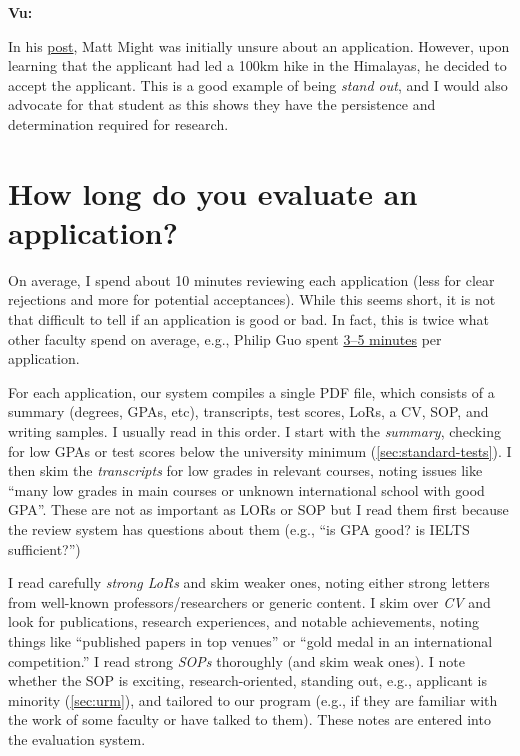 \documentclass[oneside,11pt,dvipsnames]{book}
\newenvironment{commentbox}[1][]{
  \small
  \begin{mybox}
    {\small \textbf{#1}}
  }{
  \end{mybox}
}
\begin{document}
\begin{commentbox}[Vu:]
In his \href{https://matt.might.net/articles/how-to-apply-and-get-in-to-graduate-school-in-science-mathematics-engineering-or-computer-science/}{post}, Matt Might was initially unsure about an application. However, upon learning that the applicant had led a 100km hike in the Himalayas, he decided to accept the applicant.  This is a good example of being \emph{stand out}, and I would also advocate for that student as this shows they have the persistence and determination required for research.
\end{commentbox}


\section{How long do you evaluate an application?}\label{sec:ievaluate}

On average, I spend about 10 minutes reviewing each application (less for clear rejections and more for potential acceptances). While this seems short, it is not that difficult to tell if an application is good or bad.  In fact, this
is twice what other faculty spend on average, e.g., Philip Guo spent \href{https://pg.ucsd.edu/PhD-application-tips.htm}{3--5 minutes} per application.

For each application, our system compiles a single PDF file, which consists of a summary (degrees, GPAs, etc), transcripts, test scores, LoRs, a CV, SOP, and writing samples. I usually read in this order. I start with the \emph{summary}, checking for low GPAs or test scores below the university minimum (\autoref{sec:standard-tests}). I then skim the \emph{transcripts} for low grades in relevant courses, noting issues like ``many low grades in main courses or unknown international school with good GPA''.  These are not as important as LORs or SOP but I read them first because the review system has questions about them (e.g., ``is GPA good? is IELTS sufficient?'')

I read carefully \emph{strong LoRs} and skim weaker ones, noting either strong letters from well-known professors/researchers or generic content. I skim over \emph{CV} and look for publications, research experiences, and notable achievements, noting things like ``published papers in top venues'' or ``gold medal in an international competition.''
I read strong \emph{SOPs} thoroughly (and skim weak ones). I note whether the SOP is exciting, research-oriented, standing out, e.g., applicant is minority (\autoref{sec:urm}), and tailored to our program (e.g., if they are familiar with the work of some faculty or have talked to them). These notes are entered into the evaluation system.
\end{document}
